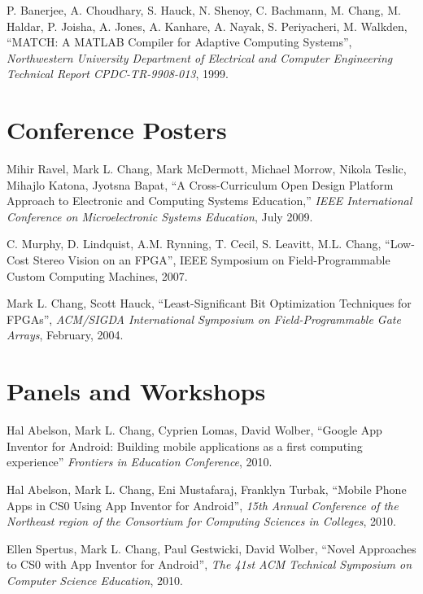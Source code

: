\documentclass[line]{res}
\begin{document}
\begin{resume}
	P. Banerjee, A. Choudhary, S. Hauck, N. Shenoy, C. Bachmann, M. Chang, M. Haldar, P. Joisha, A. Jones, A. Kanhare, A. Nayak, S. Periyacheri, M. Walkden, ``MATCH: A MATLAB Compiler for Adaptive Computing Systems'', \emph{Northwestern University Department of Electrical and Computer Engineering Technical Report CPDC-TR-9908-013}, 1999.
	
	\section{\sc Conference Posters}
	
	Mihir Ravel, Mark L. Chang, Mark McDermott, Michael Morrow, Nikola Teslic, Mihajlo Katona, Jyotsna Bapat, ``A Cross-Curriculum Open Design Platform Approach to Electronic and Computing Systems Education,'' \emph{IEEE International Conference on Microelectronic Systems Education}, July 2009. 
	
	C. Murphy, D. Lindquist, A.M. Rynning, T. Cecil, S. Leavitt, M.L. Chang, ``Low-Cost Stereo Vision on an FPGA'', IEEE Symposium on Field-Programmable Custom Computing Machines, 2007.
	
	Mark L. Chang, Scott Hauck, ``Least-Significant Bit Optimization Techniques for FPGAs'', \emph{ACM/SIGDA International Symposium on Field-Programmable Gate Arrays}, February, 2004.
	
	\section{\sc Panels and Workshops}
	
	Hal Abelson, Mark L. Chang, Cyprien Lomas, David Wolber, ``Google App Inventor for Android: Building mobile applications as a first computing experience'' \textit{Frontiers in Education Conference}, 2010.
	
	Hal Abelson, Mark L. Chang, Eni Mustafaraj, Franklyn Turbak, ``Mobile Phone Apps in CS0 Using App Inventor for Android'', \textit{15th Annual Conference of the Northeast region of the Consortium for Computing Sciences in Colleges}, 2010.
	
	Ellen Spertus, Mark L. Chang, Paul Gestwicki, David Wolber, ``Novel Approaches to CS0 with App Inventor for Android'', \textit{The 41st ACM Technical Symposium on Computer Science Education}, 2010.
	

\end{resume}
\end{document}
